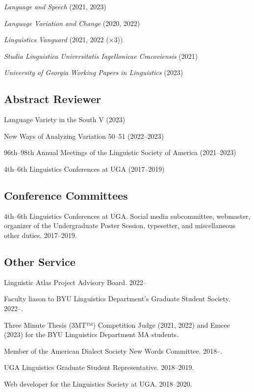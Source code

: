 \documentclass[
]{article}
\begin{document}
\emph{Language and Speech} (2021, 2023)

\emph{Language Variation and Change} (2020, 2022)

\emph{Linguistics Vanguard} (2021, 2022 (×3))

\emph{Studia Linguistica Universitatis Iagellonicae Cracoviensis} (2021)

\emph{University of Georgia Working Papers in Linguistics} (2023)

\hypertarget{abstract-reviewer}{%
\subsection{Abstract Reviewer}\label{abstract-reviewer}}

Language Variety in the South V (2023)

New Ways of Analyzing Variation 50--51 (2022--2023)

96th--98th Annual Meetings of the Linguistic Society of America
(2021--2023)

4th--6th Linguistics Conferences at UGA (2017--2019)

\hypertarget{conference-committees}{%
\subsection{Conference Committees}\label{conference-committees}}

4th--6th Linguistics Conferences at UGA. Social media subcommittee,
webmaster, organizer of the Undergraduate Poster Session, typesetter,
and miscellaneous other duties. 2017--2019.

\hypertarget{other-service}{%
\subsection{Other Service}\label{other-service}}

Linguistic Atlas Project Advisory Board. 2022--

Faculty liason to BYU Linguistics Department's Graduate Student Society.
2022--.

Three Minute Thesis (3MT™) Competition Judge (2021, 2022) and Emcee
(2023) for the BYU Linguistics Department MA students.

Member of the American Dialect Society New Words Committee. 2018--.

UGA Linguistics Graduate Student Representative. 2018--2019.

Web developer for the Linguistics Society at UGA. 2018--2020.
\end{document}
